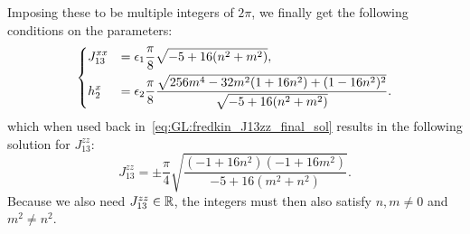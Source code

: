 Imposing these to be multiple integers of $2\pi$, we finally get the following conditions on the parameters:
\begin{equation}
\begin{dcases}%
    J_{13}^{xx} &= \epsilon_1\frac{\pi}{8}\sqrt{-5+16(n^2+m^2)}, \\
    h_2^x       &= \epsilon_2\frac{\pi}{8} \frac{
        \sqrt{256 m^4 - 32 m^2 (1 + 16n^2) + (1 - 16 n^2)^2}
    }{
        \sqrt{-5+16(n^2+m^2)}
    }.
\end{dcases}
\end{equation}
which when used back in~\cref{eq:GL:fredkin_J13zz_final_sol} results in the following solution for $J_{13}^{zz}$:
\begin{equation}
    J_{13}^{zz} =
    \pm \frac{\pi}{4}
    \sqrt{\frac{
        (-1 + 16 n^2)(-1 + 16 m^2)
    }{
        -5 + 16 (m^2 + n^2)
    }}.
\end{equation}
Because we also need $J_{13}^{zz}\in\mathbb{R}$, the integers must then also satisfy  $n,m\neq0$ and $m^2\neq n^2$.

